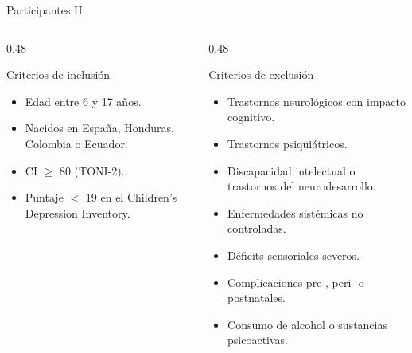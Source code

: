 \documentclass[aspectratio=169]{beamer}
\begin{document}
\begin{frame}{Participantes II}
	\vspace{-0.5cm}
	\small
	\begin{columns}[T]
		
		\begin{column}{0.48\textwidth}
			
			\begin{block}{Criterios de inclusión}
				\begin{itemize}
					\item Edad entre 6 y 17 años.
					\item Nacidos en España, Honduras, Colombia o Ecuador.
					\item CI $\geq$ 80 (TONI-2).
					\item Puntaje $<$ 19 en el Children's Depression Inventory.
				\end{itemize}
			\end{block}
			
		\end{column}
		
		\begin{column}{0.48\textwidth}
			
			\begin{alertblock}{Criterios de exclusión}
				\begin{itemize}
					\item Trastornos neurológicos con impacto cognitivo.
					\item Trastornos psiquiátricos.
					\item Discapacidad intelectual o trastornos del neurodesarrollo.
					\item Enfermedades sistémicas no controladas.
					\item Déficits sensoriales severos.
					\item Complicaciones pre-, peri- o postnatales.
					\item Consumo de alcohol o sustancias psicoactivas.
				\end{itemize}
			\end{alertblock}
		\end{column}
	\end{columns}
\end{frame}

%	
\end{document}
